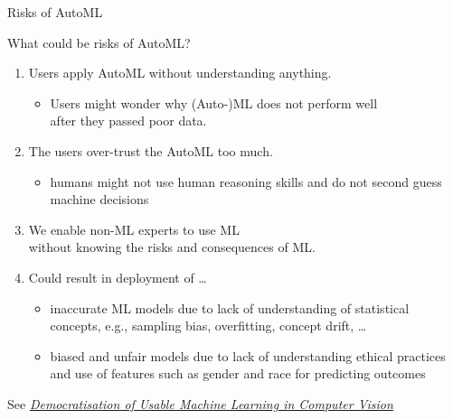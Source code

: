 \begin{frame}[c]{Risks of AutoML}

What could be risks of AutoML?
\hands
\pause

\begin{enumerate}
  \item Users apply AutoML without understanding anything.
  \begin{itemize}
    \item Users might wonder why (Auto-)ML does not perform well\\ after they passed poor data. 
  \end{itemize}
  \pause
  \item The users over-trust the AutoML too much.
  \begin{itemize}
    \item humans might not use human reasoning skills and do not second guess machine decisions
  \end{itemize}
  \pause
  \item We enable non-ML experts to use ML\\ without knowing the risks and consequences of ML.
  \pause
  \item Could result in deployment of \ldots
  \begin{itemize}
    \item inaccurate ML models due to lack of understanding of statistical concepts, e.g., sampling bias, overfitting, concept drift, \ldots
    \item biased and unfair models due to lack of understanding ethical practices and use of features such as gender and race for predicting outcomes
  \end{itemize}
\end{enumerate}

See \textit{\href{https://arxiv.org/abs/1902.06804}{Democratisation of Usable Machine Learning in Computer Vision}}

\end{frame}
